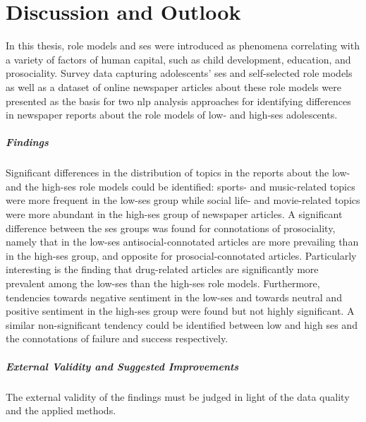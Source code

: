 \renewcommand{\imagepath}{../80-outro/img}

\chapter{Discussion and Outlook}
In this thesis, role models and \gls{ses} were introduced as phenomena correlating with a variety of factors of human capital, such as child development, education, and prosociality. Survey data capturing adolescents' \gls{ses} and self-selected role models as well as a dataset of online newspaper articles about these role models were presented as the basis for two \gls{nlp} analysis approaches for identifying differences in newspaper reports about the role models of low- and high-\gls{ses} adolescents.

\paragraph{Findings}
Significant differences in the distribution of topics in the reports about the low- and the high-\gls{ses} role models could be identified: sports- and music-related topics were more frequent in the low-\gls{ses} group while social life- and movie-related topics were more abundant in the high-\gls{ses} group of newspaper articles. A significant difference between the \gls{ses} groups was found for connotations of prosociality, namely that in the low-\gls{ses} antisocial-connotated articles are more prevailing than in the high-\gls{ses} group, and opposite for prosocial-connotated articles. Particularly interesting is the finding that drug-related articles are significantly more prevalent among the low-\gls{ses} than the high-\gls{ses} role models. Furthermore, tendencies towards negative sentiment in the low-\gls{ses} and towards neutral and positive sentiment in the high-\gls{ses} group were found but not highly significant. A similar non-significant tendency could be identified between low and high \gls{ses} and the connotations of failure and success respectively.

\paragraph{External Validity and Suggested Improvements}
The external validity of the findings must be judged in light of the data quality and the applied methods.

